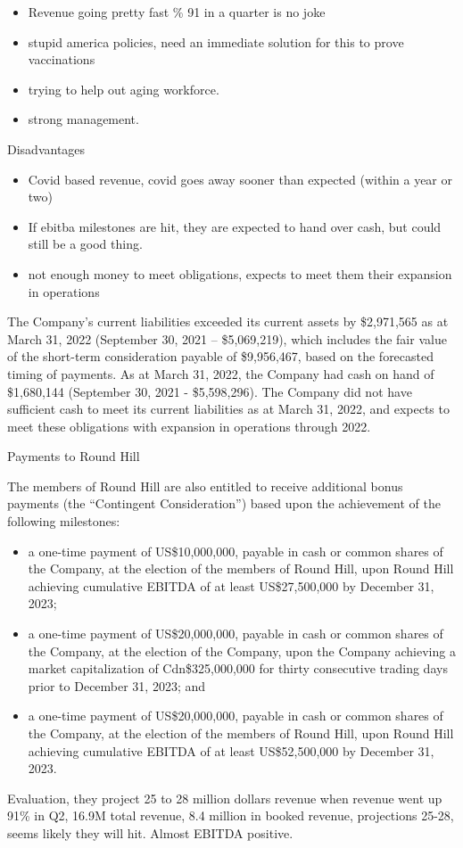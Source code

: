 \begin{itemize}
    \item Revenue going pretty fast \% 91 in a quarter is no joke
    \item stupid america policies, need an immediate solution for this to prove vaccinations
    \item trying to help out aging workforce.
    \item strong management.
\end{itemize}

Disadvantages

\begin{itemize}
    \item Covid based revenue, covid goes away sooner than expected (within a year or two)
    \item If ebitba milestones are hit, they are expected to hand over cash, but could still be a good thing.
    \item not enough money to meet obligations, expects to meet them their expansion in operations
\end{itemize}

The Company’s current liabilities exceeded its current assets by \$2,971,565 as at March 31, 2022
(September 30, 2021 – \$5,069,219), which includes the fair value of the short-term consideration payable of
\$9,956,467, based on the forecasted timing of payments. As at March 31, 2022, the Company had cash on
hand of \$1,680,144 (September 30, 2021 - \$5,598,296). The Company did not have sufficient cash to meet
its current liabilities as at March 31, 2022, and expects to meet these obligations with expansion in operations through 2022.

Payments to Round Hill

The members of Round Hill are also entitled to receive additional bonus payments (the “Contingent
Consideration”) based upon the achievement of the following milestones:
\begin{itemize}
\item a one-time payment of US\$10,000,000, payable in cash or common shares of the Company, at the
election of the members of Round Hill, upon Round Hill achieving cumulative EBITDA of at least
US\$27,500,000 by December 31, 2023;
\item a one-time payment of US\$20,000,000, payable in cash or common shares of the Company, at the
election of the Company, upon the Company achieving a market capitalization of Cdn\$325,000,000
for thirty consecutive trading days prior to December 31, 2023; and
\item a one-time payment of US\$20,000,000, payable in cash or common shares of the Company, at the
election of the members of Round Hill, upon Round Hill achieving cumulative EBITDA of at least
US\$52,500,000 by December 31, 2023.
\end{itemize}


Evaluation, they project 25 to 28 million dollars revenue when revenue went up 91\% in Q2, 16.9M total revenue, 8.4 million in booked revenue, projections 25-28, seems likely they will hit. Almost EBITDA positive.


